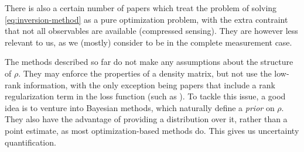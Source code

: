 \documentclass[12pt]{memoir}
\begin{document}
There is also a certain number of papers \cite{meth:CS:GLFSBE10,meth:CS:Gross-2011, meth:CS:Flammia-2012,meth:CS:Koltchinskii-2011} which treat the problem of solving \ref{eq:inversion-method} as a pure optimization problem, with the extra contraint that not all observables are available (compressed sensing). They are however less relevant to us, as we (mostly) consider to be in the complete measurement case.\medbreak

The methods described so far do not make any assumptions about the structure of $\rho$. They may enforce the properties of a density matrix, but not use the low-rank information, with the only exception being papers that include a rank regularization term in the loss function (such as \cite{meth:linear-inversion:alquier}). To tackle this issue, a good idea is to venture into Bayesian methods, which naturally define a \textit{prior} on $\rho$. They also have the advantage of providing a distribution over it, rather than a point estimate, as most optimization-based methods do. This gives us uncertainty quantification.\medbreak
\end{document}
